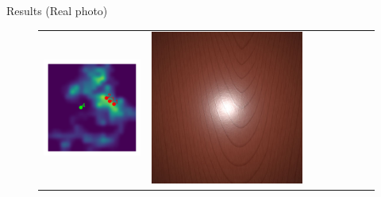 \documentclass[final]{beamer}
\newlength{\twocolwid}
\newlength{\resultwidth}
\begin{document}
\begin{frame}[t]
\begin{columns}[t]
\begin{column}{\twocolwid}
\begin{block}{Results (Real photo)}
\begin{figure}[t]
\begin{tabular}{ccrclccc}
            		\includegraphics[width=\resultwidth]{images/real/wood/posterior.pdf} &
            		\includegraphics[width=\resultwidth]{images/real/wood/good1.jpg} &

\end{tabular}
\end{figure}
\end{block}
\end{column}
\end{columns}
\end{frame}
\end{document}
